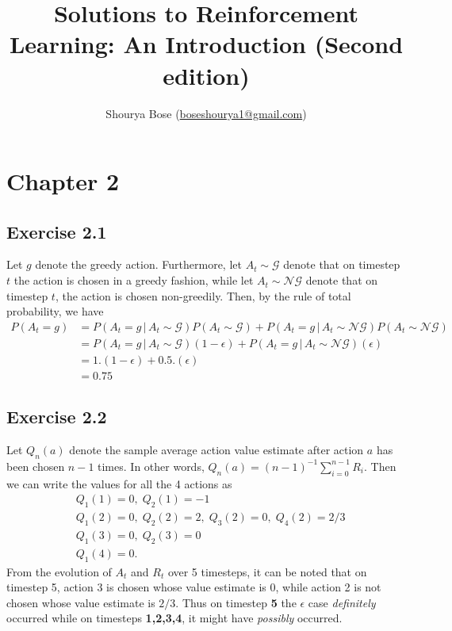 \documentclass[10pt]{article}
\title{Solutions to Reinforcement Learning: An Introduction (Second edition)}
\author{Shourya Bose (\url{boseshourya1@gmail.com})}
\newcommand{\mcal}[1]{\mathcal{#1}}
\begin{document}
	\maketitle
	\tableofcontents
	\section{Chapter 2}
	\subsection*{Exercise 2.1}
	\label{ss:2.1}
	Let $g$ denote the greedy action. Furthermore, let $A_t\sim\mcal{G}$ denote that on timestep $t$ the action is chosen in a greedy fashion, while let $A_t \sim \mcal{NG}$ denote that on timestep $t$, the action is chosen non-greedily. Then, by the rule of total probability, we have
	\begin{align*}
	P(A_t = g) &= P(A_t=g \, \vert \, A_t\sim\mcal{G}) P(A_t \sim \mcal{G}) +  P(A_t=g \, \vert \, A_t\sim\mcal{NG}) P(A_t \sim \mcal{NG})\\
	&= P(A_t=g \, \vert \, A_t\sim\mcal{G})(1-\epsilon) + P(A_t=g \, \vert \, A_t\sim\mcal{NG})(\epsilon)\\
	&= 1.(1-\epsilon) + 0.5.(\epsilon)\\
	&= 0.75
	\end{align*}
	\subsection*{Exercise 2.2}
	\label{ss:2.2}
	Let $Q_n(a)$ denote the sample average action value estimate after action $a$ has been chosen $n-1$ times. In other words, $Q_n(a) = (n-1)^{-1}\sum_{i=0}^{n-1}	R_i$. Then we can write the values for all the 4 actions as
	\begin{align*}
	& Q_1(1) = 0, \; Q_2(1) = -1\\
	& Q_1(2) = 0,\; Q_2(2) = 2,\; Q_3(2) = 0,\; Q_4(2) = 2/3\\
	& Q_1(3) = 0,\; Q_2(3) = 0\\
	& Q_1(4) = 0.
	\end{align*}
	From the evolution of $A_t$ and $R_t$ over 5 timesteps, it can be noted that on timestep 5, action 3 is chosen whose value estimate is 0, while action 2 is not chosen whose value estimate is $2/3$. Thus on timestep \textbf{5} the $\epsilon$ case \emph{definitely} occurred while on timesteps \textbf{1,2,3,4}, it might have \emph{possibly} occurred.
\end{document}
